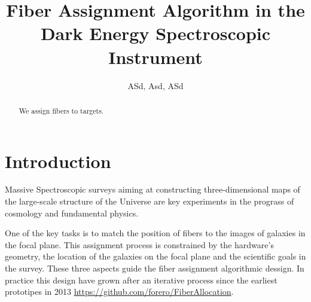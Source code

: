 \documentclass[twocolumn]{aastex62}
\begin{document}
\title{Fiber Assignment Algorithm in the Dark Energy Spectroscopic Instrument}
\author{
  ASd, Asd, ASd
}




\begin{abstract}
We assign fibers to targets.
\end{abstract}



\section{Introduction}
\label{sec:introduction}

Massive Spectroscopic surveys aiming at constructing three-dimensional
maps of the large-scale structure of the Universe are key experiments
in the prograss of cosmology and fundamental physics.

One of the key tasks is to match the position of fibers to the images
of galaxies in the focal plane. This assignment process is constrained
by the hardware's geometry, the location of the galaxies on the focal
plane and the scientific goals in the survey. 
These three aspects guide the fiber assignment algorithmic dessign.
In practice this design have grown after an iterative process since
the earliest prototipes in 2013
\url{https://github.com/forero/FiberAllocation}.   

\cite{2014SPIE.9150E..23S}
\cite{2016A&C....15....1N}


\end{document}
